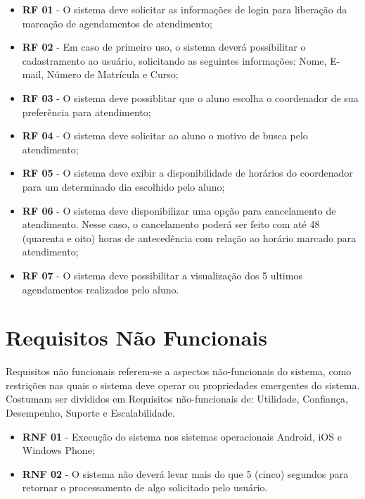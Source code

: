 		\begin{itemize}
			\item{\textbf{RF 01} - O sistema deve solicitar as informações de login para liberação da marcação de agendamentos de atendimento;}
			\item{\textbf{RF 02} - Em caso de primeiro uso, o sistema deverá possibilitar o cadastramento ao usuário, solicitando as seguintes informações: Nome, E-mail, Número de Matrícula e Curso;}
			\item{\textbf{RF 03} - O sistema deve possiblitar que o aluno escolha o coordenador de sua preferência para atendimento;}
			\item{\textbf{RF 04} - O sistema deve solicitar ao aluno o motivo de busca pelo atendimento;}
			\item{\textbf{RF 05} - O sistema deve exibir a disponibilidade de horários do coordenador para um determinado dia escolhido pelo aluno;}
			\item{\textbf{RF 06} - O sistema deve disponibilizar uma opção para cancelamento de atendimento. Nesse caso, o cancelamento poderá ser feito com até 48 (quarenta e oito) horas de antecedência com relação ao horário marcado para atendimento;}
			\item{\textbf{RF 07} - O sistema deve possibilitar a visualização dos 5 ultimos agendamentos realizados pelo aluno.}
		\end{itemize}


	\section[Requisitos Não Funcionais]{Requisitos Não Funcionais}
	\label{sec:requisitos_nao_funcionais}

		Requisitos não funcionais referem-se a aspectos não-funcionais do sistema, como restrições nas quais o sistema deve operar ou propriedades emergentes do sistema. Costumam ser divididos em Requisitos não-funcionais de: Utilidade, Confiança, Desempenho, Suporte e Escalabilidade.

		\begin{itemize}
			\item{\textbf{RNF 01} - Execução do sistema nos sistemas operacionais Android, iOS e Windows Phone;}
			\item{\textbf{RNF 02} - O sistema não deverá levar mais do que 5 (cinco) segundos para retornar o processamento de algo solicitado pelo usuário.} 
		\end{itemize}


